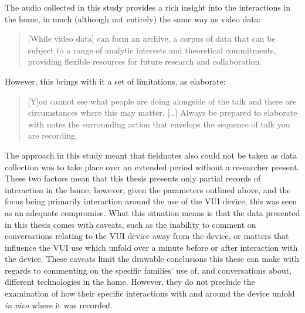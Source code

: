 \begin{revisedsubmission}
The audio collected in this study provides a rich insight into the interactions in the home, in much (although not entirely) the same way as video data:
\begin{quote}
    [While video data] can form an archive, a corpus of data that can be subject to a range of analytic interests and theoretical commitments, providing flexible resources for future research and collaboration.
\end{quote}
However, this brings with it a set of limitations, as \citet{Crabtree2012} elaborate:
\begin{quote}
    [Y]ou cannot see what people are doing alongside of the talk and there are circumstances where this may matter. [\ldots] Always be prepared to elaborate with notes the surrounding action that envelops the sequence of talk you are recording.
\end{quote}
The approach in this study meant that fieldnotes also could not be taken as data collection was to take place over an extended period without a researcher present.
These two factors mean that this thesis presents only partial records of interaction in the home; however, given the parameters outlined above, and the focus being primarily interaction around the use of the \ac{VUI} device, this was seen as an adequate compromise.
What this situation means is that the data presented in this thesis comes with caveats, such as the inability to comment on conversations relating to the \ac{VUI} device away from the device, or matters that influence the \ac{VUI} use which unfold over a minute before or after interaction with the device.
These caveats limit the drawable conclusions this these can make with regards to commenting on the specific families' use of, and conversations about, different technologies in the home.
However, they do not preclude the examination of how their specific interactions with and around the device unfold \textit{in vivo} where it was recorded.
\end{revisedsubmission}






